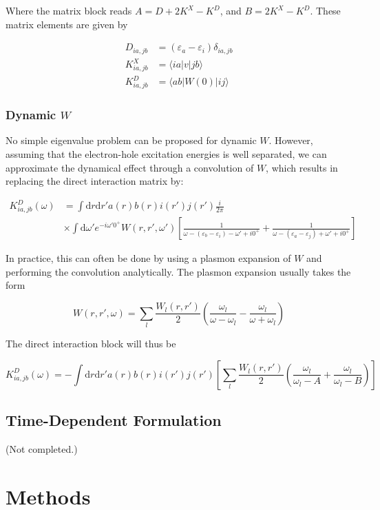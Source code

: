 \documentclass{article}
\begin{document}
Where the matrix block reads $A=D+2K^X-K^D$, and $B=2K^X-K^D$. These matrix elements are given by

$$
\begin{aligned}
D_{ia,jb}&=(\varepsilon_a-\varepsilon_i)\delta_{ia,jb}\\
K^X_{ia,jb}&=\langle ia|v|jb\rangle\\
K^D_{ia,jb}&=\langle ab|W(0)|ij\rangle
\end{aligned}
$$

\subsubsection{Dynamic $W$}

No simple eigenvalue problem can be proposed for dynamic $W$. However, assuming that the electron-hole excitation energies is well separated, we can approximate the dynamical effect through a convolution of $W$, which results in replacing the direct interaction matrix by:

$$
\begin{aligned}
K^D_{ia,jb}(\omega)&=\int\mathrm dr\mathrm dr'a(r)b(r)i(r')j(r')\frac{i}{2\pi}\\
&\times\int\mathrm d\omega'e^{-i\omega' 0^+}W(r,r',\omega')\left[\frac1{\omega-(\varepsilon_b-\varepsilon_i)-\omega'+i0^+}+\frac1{\omega-(\varepsilon_a-\varepsilon_j)+\omega'+i0^+}\right]
\end{aligned}
$$

In practice, this can often be done by using a plasmon expansion of $W$ and performing the convolution analytically. The plasmon expansion usually takes the form

$$
W(r,r', \omega)= \sum_{l} \frac{W_{l}(r, r')}2 \left(\frac{\omega_{l}}{\omega-\omega_{l}}-\frac{\omega_{l}}{\omega+\omega_{l}}\right)
$$

The direct interaction block will thus be

$$
K^D_{ia,jb}(\omega)=-\int\mathrm dr\mathrm dr'a(r)b(r)i(r')j(r')\left[\sum_l\frac{W_{l}(r, r')}2 \left(\frac{\omega_{l}}{\omega_{l}-A}+\frac{\omega_{l}}{\omega_{l}-B}\right)\right]
$$

\subsection{Time-Dependent Formulation}
(Not completed.)
\section{Methods}
\end{document}
